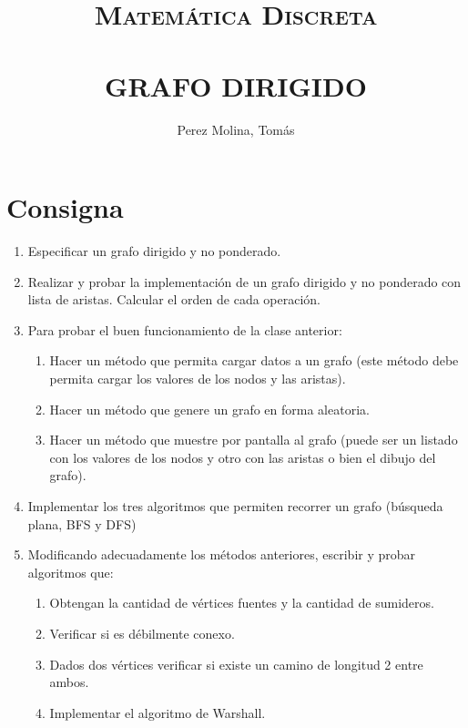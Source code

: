 \documentclass[a4paper,10pt]{extarticle}
\title{	\large \textsc{Matemática Discreta} 	%
		 	\\[2.0cm]								%
			\HRule{0.5pt} \\						%
			\LARGE \textbf{\uppercase{Grafo Dirigido}}	%
			\HRule{2pt} \\ [0.5cm]		%
}
\author{
        Perez Molina, Tomás\\
}
\makeatletter
\def\printtitle{%
    {\centering \@title\par}}
\def\printauthor{%
    {\centering \large \@author}}
\makeatother
\begin{document}
\thispagestyle{empty}		%

\printtitle					%
  	\vfill
\printauthor				%
\newpage



\tableofcontents
\thispagestyle{empty}
\pagebreak

\setcounter{page}{1} %

\pagebreak
\section{Consigna}
  \begin{enumerate}
    \item Especificar un grafo dirigido y no ponderado.
    \item Realizar y probar la implementación de un grafo dirigido y no ponderado con lista de aristas. Calcular el orden de cada operación.
    \item Para probar el buen funcionamiento de la clase anterior:
      \begin{enumerate}[label=(\roman*)]
        \item Hacer un método que permita cargar datos a un grafo (este método debe permita cargar los valores de los nodos y las aristas).
        \item Hacer un método que genere un grafo en forma aleatoria.
        \item Hacer un método que muestre por pantalla al grafo (puede ser un listado con los valores de los nodos y otro con las aristas o bien el dibujo del grafo).
      \end{enumerate}
    \item Implementar los tres algoritmos que permiten recorrer un grafo (búsqueda plana, BFS y DFS)
    \item Modificando adecuadamente los métodos anteriores, escribir y probar algoritmos que:
      \begin{enumerate}[label=(\roman*)]
        \item Obtengan la cantidad de vértices fuentes y la cantidad de sumideros.
        \item Verificar si es débilmente conexo.
        \item Dados dos vértices verificar si existe un camino de longitud 2 entre ambos.
        \item Implementar el algoritmo de Warshall.
      \end{enumerate}
  \end{enumerate}
\end{document}
